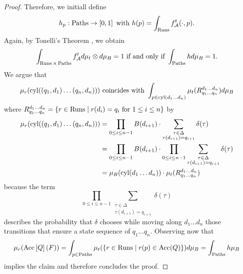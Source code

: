 \begin{proof}
  Therefore, we initiall define
  \begin{equation*}
    h_{p}:\operatorname{Paths}\rightarrow\left[0,1\right]\text{ with }
      h(p) = \int_{\operatorname{Runs}}f_{\mathcal{A}}^{t}(\cdot, p).
  \end{equation*}
  Again, by Tonelli's Theorem \cite{Bauer}, we obtain
  \begin{equation*}
    \int_{\operatorname{Runs}\times\operatorname{Paths}}f_{\mathcal{A}}^{t}d\mu_{t}\otimes d\mu_{B} = 1
    \text{ if and only if }\int_{\operatorname{Paths}}h d\mu_{B} = 1.
  \end{equation*}
  We argue that 
  \begin{equation*}
    \mu_{r}(\operatorname{cyl}(\left(q_{1}, d_{1}\right)\dots\left(q_{n}, d_{n}\right)))
    \text{ coincides with }\int_{p\in\operatorname{cyl}(d_{1}\dots d_{n})}\mu_{t}(
    R^{d_{1}\dots d_{n}}_{q_{1}\dots q_{n}})d\mu_{B}
  \end{equation*} where $R^{d_{1}\dots d_{n}}_{q_{1}\dots q_{n}} = \left\{
    r\in\operatorname{Runs}\mid r(d_{i}) = q_{i}\text{ for }1\leq i\leq n\right\}$ by
  \begin{align*}
    \mu_{r}(\operatorname{cyl}(\left(q_{1}, d_{1}\right)\dots\left(q_{n}, d_{n}\right))) &=
      \prod\limits_{0\leq i\leq n-1}B(d_{i+1})\cdot\sum\limits_{
        \substack{\tau\in\Delta\\\tau(d_{i+1}) = q_{i+1}}}\delta(\tau)\\
    &=\prod\limits_{0\leq i\leq n-1}B(d_{i+1})\cdot\prod
        \limits_{0\leq i\leq n-1}\sum\limits_{\substack{
        \tau\in\Delta\\\tau(d_{i+1}) = q_{i+1}}}\delta(\tau)\\
    &=\mu_{B}(\operatorname{cyl}(d_{1}\dots d_{n}))\cdot\mu_{t}(
        R^{d_{1}\dots d_{n}}_{q_{1}\dots q_{n}})\\
  \end{align*}
  because the term
  \begin{equation*}
    \prod\limits_{0\leq i\leq n-1}\sum\limits_{\substack{
    \tau\in\Delta\\\tau(d_{i+1}) = q_{i+1}}}\delta(\tau)
  \end{equation*} 
  describes the probability that $\delta$ chooses while moving along
  $d_{1}\dots d_{n}$ those transitions that ensure a state sequence  of
  $q_{1}\dots q_{n}$. Observing now that
  \begin{equation*}
    \mu_{r}(\operatorname{Acc}\left[Q\right](F)) = 
    \int_{p\in\operatorname{Paths}}\mu_{t}(\left\{r\in\operatorname{Runs}\mid r(p)\in\operatorname{Acc}(Q)\right\}) d\mu_{B} = 
    \int_{\operatorname{Paths}} h\mu_{B}
  \end{equation*}
  implies the claim and therefore concludes the proof.
\end{proof}

